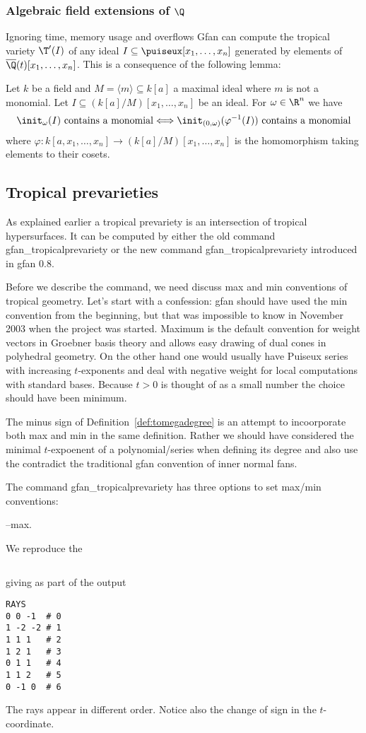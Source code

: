 \subsubsection{Algebraic field extensions of $\Q$}
Ignoring time, memory usage and overflows Gfan can compute the tropical variety $\T'(I)$ of any ideal $I\subseteq \puiseux[x_1,\dots,x_n]$ generated by elements of $\overline{\Q}(t)[x_1,\dots,x_n]$. This is a consequence of the following lemma:
\begin{lemma}\cite[Lemma~3.12]{lifting}
\label{lem:fieldextension}
Let $k$ be a field and $M=\langle m\rangle\subseteq k[a]$ a maximal ideal where $m$ is not a monomial. Let 
$I\subseteq (k[a]/M)[x_1,\dots,x_n]$ be an ideal. For $\omega\in\R^n$ we
have
$$\init_\omega(I) \textup{ contains a monomial} \Longleftrightarrow \init_{(0,\omega)}(\varphi^{-1}(I)) \textup{ contains a monomial}$$ 
where $\varphi:k[a,x_1,\dots,x_n]\rightarrow (k[a]/M)[x_1,\dots,x_n]$ is the homomorphism taking elements to their cosets.
\end{lemma}

\subsection{Tropical prevarieties}
As explained earlier a tropical prevariety is an intersection of tropical hypersurfaces. It can be computed by either the old command {gfan\_tropicalprevariety} or the new command {gfan\_tropicalprevariety} introduced in gfan 0.8.

Before we describe the command, we need discuss max and min conventions of tropical geometry. Let's start with a confession: gfan should have used the min convention from the beginning, but that was impossible to know in November 2003 when the project was started. Maximum is the default convention for weight vectors in Groebner basis theory and allows easy drawing of dual cones in polyhedral geometry. On the other hand one would usually have Puiseux series with increasing $t$-exponents and deal with negative weight for local computations with standard bases. Because $t>0$ is thought of as a small number the choice should have been minimum.

The minus sign of Definition~\ref{def:tomegadegree} is an attempt to incoorporate both max and min in the same definition. Rather we should have considered the minimal $t$-expoenent of a polynomial/series when defining its degree and also use the contradict the traditional gfan convention of inner normal fans.

The command {gfan\_tropicalprevariety} has three options to set max/min conventions:
\begin{description}
\item{--max}.
\end{description}

We reproduce the
\begin{verbatim}
\end{verbatim}
giving as part of the output
\begin{verbatim}
RAYS
0 0 -1	# 0
1 -2 -2	# 1
1 1 1	# 2
1 2 1	# 3
0 1 1	# 4
1 1 2	# 5
0 -1 0	# 6
\end{verbatim}
The rays appear in different order. Notice also the change of sign in the $t$-coordinate.
